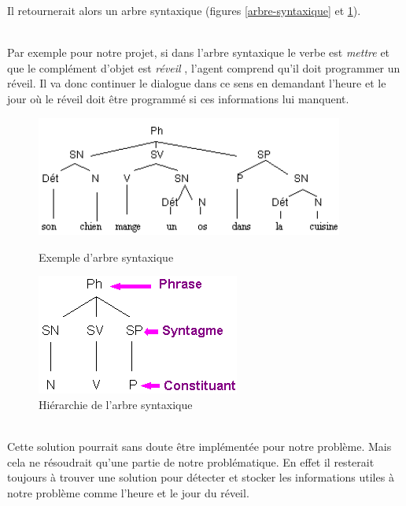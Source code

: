 Il retournerait alors un arbre syntaxique (figures \ref{arbre-syntaxique} et \ref{arbre-syntaxique2}). 

~\\\indent Par exemple pour notre projet, si dans l'arbre syntaxique le verbe est \og \textit{mettre} \fg{} et que le complément d'objet est \og \textit{réveil} \fg, l'agent \og comprend \fg{} qu'il doit programmer un réveil. Il va donc continuer le dialogue dans ce sens en demandant l'heure et le jour où le réveil doit être programmé si ces informations lui manquent.

\begin{figure}[!h]
    \centering
    \begin{minipage}{.5\textwidth}
        \centering
        \includegraphics[width=0.9\textwidth]{images/arbre.png}
        \caption{Exemple d'arbre syntaxique}
        \label{arbre-syntaxique}
    \end{minipage}%
    \begin{minipage}{0.5\textwidth}
        \centering
        \includegraphics[width=0.9\linewidth]{images/arbre2.png}
        \caption{Hiérarchie de l'arbre syntaxique}
        \label{arbre-syntaxique2}
    \end{minipage}
\end{figure}

~\\\indent
Cette solution pourrait sans doute être implémentée pour notre problème. Mais cela ne résoudrait qu'une partie de notre problématique. En effet il resterait toujours à trouver une solution pour détecter et stocker les informations utiles à notre problème comme l'heure et le jour du réveil. 

